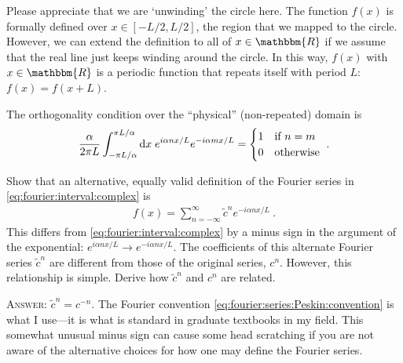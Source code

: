 \documentclass[12pt, oneside]{report}    %
\begin{document}
\begin{exercise}
Please appreciate that we are `unwinding' the circle here. The function $f(x)$ is formally defined over $x\in[-L/2,L/2]$, the region that we mapped to the circle. However, we can extend the definition to all of $x\in \mathbbm{R}$ if we assume that the real line just keeps winding around the circle. In this way, $f(x)$ with $x\in \mathbbm{R}$ is a periodic function that repeats itself with period $L$: $f(x) = f(x+L)$.
\end{exercise}

\noindent
The orthogonality condition over the ``physical'' (non-repeated) domain is 
\begin{align}
    \frac{\alpha}{2\pi L} \int_{-\pi L/\alpha}^{\pi L/\alpha} \operatorname{d}\!{x}\;
    e^{i\alpha n x/L}
    e^{-i\alpha m x/L}
    =
    \begin{cases}
    1 &\textnormal{if } n=m\\
    0 &\textnormal{otherwise} 
    \end{cases}
    \ .
\end{align}


\begin{exercise}\label{ex:Fourier:using:Peskin:exponential:sign:convention}
Show that an alternative, equally valid definition of the Fourier series in \eqref{eq:fourier:interval:complex} is
\begin{align}
    f(x) = \sum_{n=-\infty}^\infty \tilde c^n e^{-i\alpha n x/L} \ .
    \label{eq:fourier:series:Peskin:convention}
\end{align}
This differs from \eqref{eq:fourier:interval:complex} by a minus sign in the argument of the exponential: $e^{i\alpha nx/L} \to e^{-i\alpha nx/L}$. The coefficients of this alternate Fourier series $\tilde c^n$ are different from those of the original series, $c^n$. However, this relationship is simple. Derive how $\tilde c^n$ and $c^n$ are related.

\textsc{Answer}: $\tilde c^n = c^{-n}$. The Fourier convention \eqref{eq:fourier:series:Peskin:convention} is what I use---it is what is standard in graduate textbooks in my field. This somewhat unusual minus sign can cause some head scratching if you are not aware of the alternative choices for how one may define the Fourier series.
\end{exercise}
\end{document}
